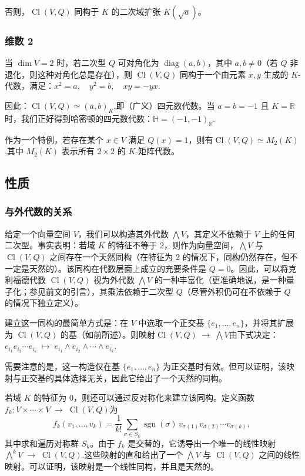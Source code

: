 否则，$\operatorname{Cl}(V, Q)$ 同构于 $K$ 的二次域扩张 $K(\sqrt{a})$。
\subsubsection{维数 2}
当 $\dim V = 2$ 时，若二次型 $Q$ 可对角化为 $\operatorname{diag}(a, b)$，其中 $a, b \neq 0$（若 $Q$ 非退化，则这种对角化总是存在），则 $\operatorname{Cl}(V, Q)$ 同构于一个由元素 $x, y$ 生成的 $K$-代数，满足：$x^2 = a, \quad y^2 = b, \quad xy = - yx$.

因此：$\operatorname{Cl}(V, Q) \simeq (a, b)_K$,即（广义）四元数代数。当 $a = b = -1$ 且 $K = \mathbb{R}$ 时，我们正好得到哈密顿的四元数代数：$\mathbb{H} = (-1, -1)_{\mathbb{R}}$.

作为一个特例，若存在某个 $x \in V$ 满足 $Q(x) = 1$，则有$\operatorname{Cl}(V, Q) \simeq M_2(K)$,其中 $M_2(K)$ 表示所有 $2 \times 2$ 的 $K$-矩阵代数。
\subsection{性质}
\subsubsection{与外代数的关系}
给定一个向量空间 $V$，我们可以构造其外代数 $\bigwedge V$，其定义不依赖于 $V$ 上的任何二次型。事实表明：若域 $K$ 的特征不等于 2，则作为向量空间，$\bigwedge V$ 与 $\operatorname{Cl}(V, Q)$ 之间存在一个天然同构（在特征为 2 的情况下，同构仍然存在，但不一定是天然的）。该同构在代数层面上成立的充要条件是 $Q = 0$。因此，可以将克利福德代数 $\operatorname{Cl}(V, Q)$ 视为外代数 $\bigwedge V$ 的一种丰富化（更准确地说，是一种量子化；参见前文的引言），其乘法依赖于二次型 $Q$（尽管外积仍可在不依赖于 $Q$ 的情况下独立定义）。

建立这一同构的最简单方式是：在 $V$ 中选取一个正交基 $\{e_1, \ldots, e_n\}$，并将其扩展为 $\operatorname{Cl}(V, Q)$ 的基（如前所述）。则映射$\operatorname{Cl}(V, Q) \;\longrightarrow\; \bigwedge V$由下式决定：$e_{i_1} e_{i_2} \cdots e_{i_k} \;\mapsto\; e_{i_1} \wedge e_{i_2} \wedge \cdots \wedge e_{i_k}$.

需要注意的是，这一构造仅在基 $\{e_1, \ldots, e_n\}$ 为正交基时有效。但可以证明，该映射与正交基的具体选择无关，因此它给出了一个天然的同构。

若域 $K$ 的特征为 $0$，则还可以通过反对称化来建立该同构。定义函数$f_k : V \times \cdots \times V \;\longrightarrow\; \operatorname{Cl}(V, Q)$为
$$
f_k(v_1, \ldots, v_k) = \frac{1}{k!} \sum_{\sigma \in S_k} \operatorname{sgn}(\sigma)\, v_{\sigma(1)} v_{\sigma(2)} \cdots v_{\sigma(k)},~
$$
其中求和遍历对称群 $S_k$。由于 $f_k$ 是交替的，它诱导出一个唯一的线性映射$\bigwedge\nolimits^k V \;\longrightarrow\; \operatorname{Cl}(V, Q)$.这些映射的直和给出了一个 $\bigwedge V$ 与 $\operatorname{Cl}(V, Q)$ 之间的线性映射。可以证明，该映射是一个线性同构，并且是天然的。

